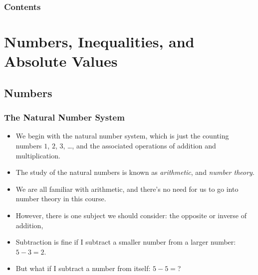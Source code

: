 \documentclass[serif,ignorenonframetext]{beamer}
\title{\commonTitleZeroZeroA}
\subtitle{\commonSubtitleZeroZeroA}
\author{\commonAuthor}
\institute{\commonInstitute}
\date{\commonDateZeroZeroA}
\begin{document}

\begin{frame}
  \titlepage
\end{frame}

\begin{frame}
  \frametitle{Contents}
  \tableofcontents
\end{frame}


\section{Numbers, Inequalities, and Absolute Values}

\subsection{Numbers}

\begin{frame}
  \frametitle{The Natural Number System}
  \begin{itemize}[<+->]
  \item We begin with the natural number system, which is just
    the counting numbers $1$, $2$, $3$, \ldots, and the associated
    operations of addition and multiplication.
  \item The study of the natural numbers is known as \textit{arithmetic},
    and \textit{number theory}.
  \item We are all familiar with arithmetic, and there's no need for
    us to go into number theory in this course.
  \item However, there is one subject we should consider: the opposite or
    inverse of addition, 
  \item Subtraction is fine if I subtract a smaller number from a larger
    number: $5-3=2$.
  \item But what if I subtract a number from itself: $5-5=$?
  \end{itemize}
\end{frame}
\end{document}
